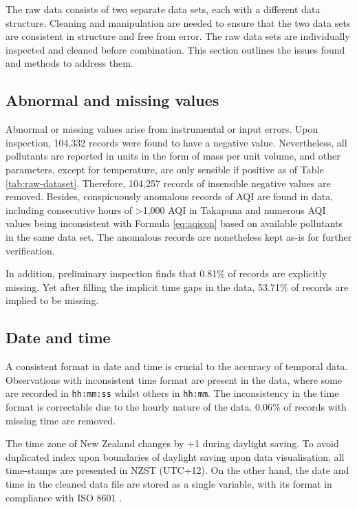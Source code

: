 \documentclass{aucklandthesis}
\begin{document}
The raw data consists of two separate data sets, each with a different data structure. Cleaning and manipulation are needed to ensure that the two data sets are consistent in structure and free from error. The raw data sets are individually inspected and cleaned before combination. This section outlines the issues found and methods to address them.

\hypertarget{sec:data-extreme-value}{%
\subsection{Abnormal and missing values}\label{sec:data-extreme-value}}

Abnormal or missing values arise from instrumental or input errors. Upon inspection, 104,332 records were found to have a negative value. Nevertheless, all pollutants are reported in units in the form of mass per unit volume, and other parameters, except for temperature, are only sensible if positive as of Table \ref{tab:raw-dataset}. Therefore, 104,257 records of insensible negative values are removed. Besides, conspicuously anomalous records of AQI are found in data, including consecutive hours of \textgreater1,000 AQI in Takapuna and numerous AQI values being inconsistent with Formula \ref{eq:aqicon} based on available pollutants in the same data set. The anomalous records are nonetheless kept as-is for further verification.

In addition, preliminary inspection finds that 0.81\% of records are explicitly missing. Yet after filling the implicit time gaps in the data, 53.71\% of records are implied to be missing.

\hypertarget{date-and-time}{%
\subsection{Date and time}\label{date-and-time}}

A consistent format in date and time is crucial to the accuracy of temporal data. Observations with inconsistent time format are present in the data, where some are recorded in \texttt{hh:mm:ss} whilst others in \texttt{hh:mm}. The inconsistency in the time format is correctable due to the hourly nature of the data. 0.06\% of records with missing time are removed.

The time zone of New Zealand changes by +1 during daylight saving. To avoid duplicated index upon boundaries of daylight saving upon data visualisation, all time-stamps are presented in NZST (UTC+12). On the other hand, the date and time in the cleaned data file are stored as a single variable, with its format in compliance with ISO 8601 \autocite{iso8601,readr}.
\end{document}

